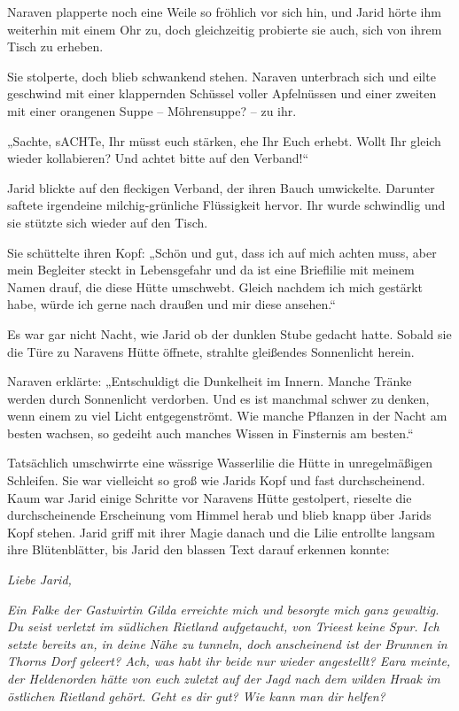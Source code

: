 Naraven plapperte noch eine Weile so fröhlich vor sich hin, und Jarid hörte ihm weiterhin mit einem Ohr zu, doch gleichzeitig probierte sie auch, sich von ihrem Tisch zu erheben.

Sie stolperte, doch blieb schwankend stehen. Naraven unterbrach sich und eilte geschwind mit einer klappernden Schüssel voller Apfelnüssen und einer zweiten mit einer orangenen Suppe – Möhrensuppe? – zu ihr.

„Sachte, sACHTe, Ihr müsst euch stärken, ehe Ihr Euch erhebt. Wollt Ihr gleich wieder kollabieren? Und achtet bitte auf den Verband!“

Jarid blickte auf den fleckigen Verband, der ihren Bauch umwickelte. Darunter saftete irgendeine milchig-grünliche Flüssigkeit hervor. Ihr wurde schwindlig und sie stützte sich wieder auf den Tisch.

Sie schüttelte ihren Kopf: „Schön und gut, dass ich auf mich achten muss, aber mein Begleiter steckt in Lebensgefahr und da ist eine Brieflilie mit meinem Namen drauf, die diese Hütte umschwebt. Gleich nachdem ich mich gestärkt habe, würde ich gerne nach draußen und mir diese ansehen.“



\trennzeichen



Es war gar nicht Nacht, wie Jarid ob der dunklen Stube gedacht hatte. Sobald sie die Türe zu Naravens Hütte öffnete, strahlte gleißendes Sonnenlicht herein.

Naraven erklärte: „Entschuldigt die Dunkelheit im Innern. Manche Tränke werden durch Sonnenlicht verdorben. Und es ist manchmal schwer zu denken, wenn einem zu viel Licht entgegenströmt. Wie manche Pflanzen in der Nacht am besten wachsen, so gedeiht auch manches Wissen in Finsternis am besten.“

Tatsächlich umschwirrte eine wässrige Wasserlilie die Hütte in unregelmäßigen Schleifen. Sie war vielleicht so groß wie Jarids Kopf und fast durchscheinend. Kaum war Jarid einige Schritte vor Naravens Hütte gestolpert, rieselte die durchscheinende Erscheinung vom Himmel herab und blieb knapp über Jarids Kopf stehen. Jarid griff mit ihrer Magie danach und die Lilie entrollte langsam ihre Blütenblätter, bis Jarid den blassen Text darauf erkennen konnte:\bigskip



\textit{Liebe Jarid,}



\textit{Ein Falke der Gastwirtin Gilda erreichte mich und besorgte mich ganz gewaltig. Du seist verletzt im südlichen Rietland aufgetaucht, von Trieest keine Spur. Ich setzte bereits an, in deine Nähe zu tunneln, doch anscheinend ist der Brunnen in Thorns Dorf geleert? Ach, was habt ihr beide nur wieder angestellt? Eara meinte, der Heldenorden hätte von euch zuletzt auf der Jagd nach dem wilden Hraak im östlichen Rietland gehört. Geht es dir gut? Wie kann man dir helfen?}

